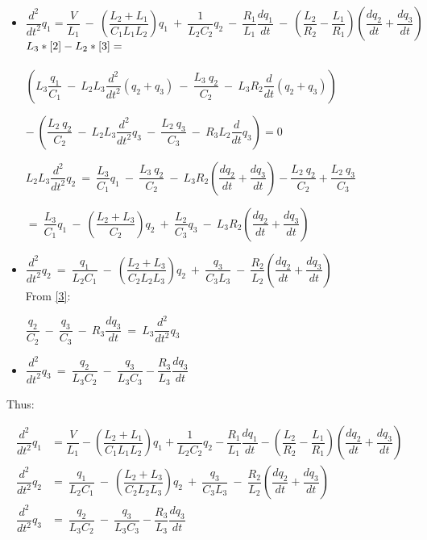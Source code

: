 \documentclass[10pt,a4paper]{article}
\begin{document}
\begin{itemize}
	\item $\dfrac{d^2}{dt^2} q_1 = \dfrac{V}{L_1} \ - \ \left( \dfrac{L_2 + L_1}{C_1 L_1 L_2} \right) q_1 \ + \ \dfrac{1}{L_2 C_2} q_2 \ - \ \dfrac{R_1}{L_1} \dfrac{dq_1}{dt} \ - \ \left( \dfrac{L_2}{R_2} - \dfrac{L_1}{R_1} \right) \left( \dfrac{dq_2}{dt} + \dfrac{dq_3}{dt} \right)$\\

	$L_3*\eqref{2} - L_2*\eqref{3} =$ \\\\ $\left( L_3 \dfrac{q_1}{C_1} \ - \ L_2 L_3 \dfrac{d^2}{dt^2} (q_2 + q_3) \ - \ \dfrac{L_3 \ q_2}{C_2} \ - \ L_3 R_2 \dfrac{d}{dt} (q_2 + q_3) \right)$ \begin{flushright}
	$- \ \left( \dfrac{L_2\  q_2}{C_2} \ - \ L_2 L_3 \dfrac{d^2}{dt^2} q_3 \ - \ \dfrac{L_2 \ q_3}{C_3} \ - \ R_3 L_2 \dfrac{d}{dt} q_3 \right) = 0$
\end{flushright} 
	$L_2 L_3 \dfrac{d^2}{dt^2} q_2 \ = \ \dfrac{L_3}{C_1} q_1 \ - \ \dfrac{L_3 \ q_2}{C_2} \ - \ L_3 R_2 \left( \dfrac{dq_2}{dt} +  \dfrac{dq_3}{dt} \right) - \dfrac{L_2 \ q_2}{C_2} + \dfrac{L_2 \ q_3}{C_3} $ 
\begin{flushright}
	$= \ \dfrac{L_3}{C_1} q_1 \ - \ \left( \dfrac{L_2 + L_3}{C_2} \right) q_2 \ + \ \dfrac{L_2}{C_3} q_3 \ - \ L_3 R_2 \left( \dfrac{dq_2}{dt} + \dfrac{dq_3}{dt} \right)$
\end{flushright}

	\item $\dfrac{d^2}{dt^2} q_2 \ = \ \dfrac{q_1}{L_2 C_1} \ - \ \left( \dfrac{L_2 + L_3}{C_2 L_2 L_3} \right) q_2 \ + \ \dfrac{q_3}{C_3 L_3} \ - \ \dfrac{R_2}{L_2} \left( \dfrac{dq_2}{dt} + \dfrac{dq_3}{dt} \right)$\\
	
From \eqref{3}:

	$\dfrac{q_2}{C_2} \ - \ \dfrac{q_3}{C_3} \ - \ R_3 \dfrac{dq_3}{dt} \ = \ L_3 \dfrac{d^2}{dt^2} q_3$\\

	\item $\dfrac{d^2}{dt^2} q_3 \ = \ \dfrac{q_2}{L_3 C_2} \ - \ \dfrac{q_3}{L_3 C_3} - \dfrac{R_3}{L_3} \dfrac{dq_3}{dt}$\\
\end{itemize}

Thus:

\begin{align*}
	\dfrac{d^2}{dt^2} q_1 &= \dfrac{V}{L_1} - \left( \dfrac{L_2 + L_1}{C_1 L_1 L_2} \right) q_1 + \dfrac{1}{L_2 C_2} q_2 - \dfrac{R_1}{L_1} \dfrac{dq_1}{dt} - \left( \dfrac{L_2}{R_2} - \dfrac{L_1}{R_1} \right) \left( \dfrac{dq_2}{dt} + \dfrac{dq_3}{dt} \right) \\
	\dfrac{d^2}{dt^2} q_2 &= \ \dfrac{q_1}{L_2 C_1} \ - \ \left( \dfrac{L_2 + L_3}{C_2 L_2 L_3} \right) q_2 \ + \ \dfrac{q_3}{C_3 L_3} \ - \ \dfrac{R_2}{L_2} \left( \dfrac{dq_2}{dt} + \dfrac{dq_3}{dt} \right) \\
	\dfrac{d^2}{dt^2} q_3 &= \ \dfrac{q_2}{L_3 C_2} \ - \ \dfrac{q_3}{L_3 C_3} - \dfrac{R_3}{L_3} \dfrac{dq_3}{dt}
\end{align*}
\end{document}
